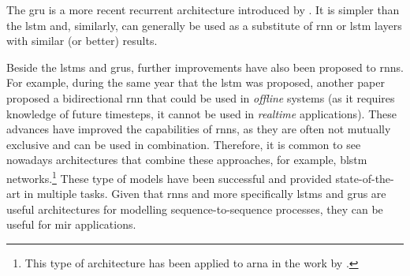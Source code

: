 

The \gls{gru} is a more recent recurrent architecture
introduced by \textcite{cho2014learning}. It is simpler than
the \gls{lstm} and, similarly, can generally be used as a
substitute of \gls{rnn} or \gls{lstm} layers with similar
(or better) results.

Beside the \glspl{lstm} and \glspl{gru}, further
improvements have also been proposed to \glspl{rnn}. For
example, during the same year that the \gls{lstm} was
proposed, another paper proposed a bidirectional \gls{rnn}
that could be used in \emph{offline} systems (as it requires
knowledge of future timesteps, it cannot be used in
\emph{realtime} applications). These advances have improved
the capabilities of \glspl{rnn}, as they are often not
mutually exclusive and can be used in combination.
Therefore, it is common to see nowadays architectures that
combine these approaches, for example, \gls{blstm}
networks.\footnote{This type of architecture has been
applied to \gls{arna} in the work by
\textcite{chen2018functional}.} These type of models have
been successful and provided state-of-the-art in multiple
tasks. Given that \glspl{rnn} and more specifically
\glspl{lstm} and \glspl{gru} are useful architectures for
modelling sequence-to-sequence processes, they can be useful
for \gls{mir} applications.
